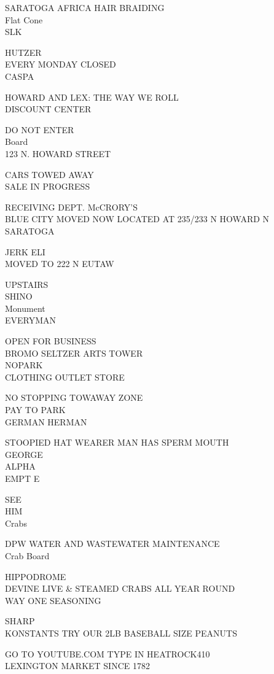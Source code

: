 \documentclass[10pt,letterpaper]{article}
\begin{document}
SARATOGA AFRICA HAIR BRAIDING\\
Flat Cone\\
SLK

HUTZER\\
EVERY MONDAY CLOSED\\
CASPA

HOWARD AND LEX: THE WAY WE ROLL\\
DISCOUNT CENTER

DO NOT ENTER\\
Board\\
123 N. HOWARD STREET

CARS TOWED AWAY\\
SALE IN PROGRESS

RECEIVING DEPT. McCRORY'S\\
BLUE CITY MOVED NOW LOCATED AT 235/233 N HOWARD N SARATOGA

JERK ELI\\
MOVED TO 222 N EUTAW

UPSTAIRS\\
SHINO\\
Monument\\
EVERYMAN

OPEN FOR BUSINESS\\
BROMO SELTZER ARTS TOWER\\
NOPARK\\
CLOTHING OUTLET STORE

NO STOPPING TOWAWAY ZONE\\
PAY TO PARK\\
GERMAN HERMAN

STOOPIED HAT WEARER MAN HAS SPERM MOUTH\\
GEORGE\\
ALPHA\\
EMPT E

SEE\\
HIM\\
Crabs

DPW WATER AND WASTEWATER MAINTENANCE\\
Crab Board

HIPPODROME\\
DEVINE LIVE \& STEAMED CRABS ALL YEAR ROUND\\
WAY ONE SEASONING

SHARP\\
KONSTANTS TRY OUR 2LB BASEBALL SIZE PEANUTS

GO TO YOUTUBE.COM TYPE IN HEATROCK410\\
LEXINGTON MARKET SINCE 1782
\end{document}

